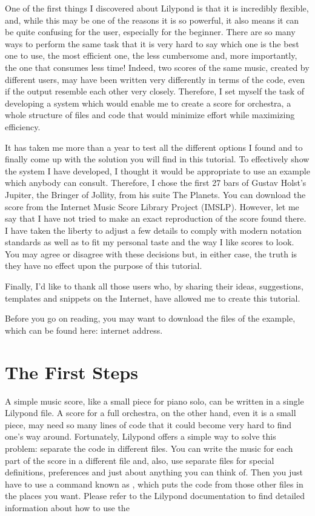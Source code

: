 \documentclass[../../LilyPond-Tutorials]{subfiles}
\begin{document}
One of the first things I discovered about Lilypond is that it is incredibly flexible, and, while this may be one of the reasons it is so powerful, it also means it can be quite confusing for the user, especially for the beginner.
There are so many ways to perform the same task that it is very hard to say which one is the best one to use, the most efficient one, the less cumbersome and, more importantly, the one that consumes less time!
Indeed, two scores of the same music, created by different users, may have been written very differently in terms of the code, even if the output resemble each other very closely.
Therefore, I set myself the task of developing a system which would enable me to create a score for orchestra, a whole structure of files and code that would minimize effort while maximizing efficiency.

It has taken me more than a year to test all the different options I found and to finally come up with the solution you will find in this tutorial.
To effectively show the system I have developed, I thought it would be appropriate to use an example which anybody can consult.
Therefore, I chose the first 27 bars of Gustav Holst's Jupiter, the Bringer of Jollity, from his suite The Planets.
You can download the score from the Internet Music Score Library Project (IMSLP).
However, let me say that I have not tried to make an exact reproduction of the score found there.
I have taken the liberty to adjust a few details to comply with modern notation standards as well as to fit my personal taste and the way I like scores to look.
You may agree or disagree with these decisions but, in either case, the truth is they have no effect upon the purpose of this tutorial.

Finally, I'd like to thank all those users who, by sharing their ideas, suggestions, templates and snippets on the Internet, have allowed me to create this tutorial.

Before you go on reading, you may want to download the files of the example, which can be found here: internet address.

\section{The First Steps}

A simple music score, like a small piece for piano solo, can be written in a single Lilypond file.
A score for a full orchestra, on the other hand, even it is a small piece, may need so many lines of code that it could become very hard to find one's way around. 
Fortunately, Lilypond offers a simple way to solve this problem: separate the code in different files.
You can write the music for each part of the score in a different file and, also, use separate files for special definitions, preferences and just about anything you can think of. 
Then you just have to use a command known as , which puts the code from those other files in the places you want.
Please refer to the Lilypond documentation to find detailed information about how to use the 
\end{document}
